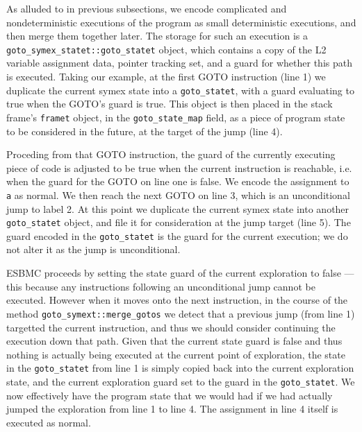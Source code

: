 \documentclass{article}
\begin{document}
As alluded to in previous subsections, we encode complicated and
nondeterministic executions of the program as small deterministic executions,
and then merge them together later. The storage for such an execution is a
\texttt{goto\_symex\_statet::goto\_statet} object, which contains a copy of
the L2 variable assignment data, pointer tracking set, and a guard for whether
this path is executed.  Taking our example, at the first GOTO instruction (line
1) we duplicate the current symex state into a \texttt{goto\_statet}, with a
guard evaluating to true when the GOTO's guard is true. This object is then
placed in the stack frame's \texttt{framet} object, in the
\texttt{goto\_state\_map} field, as a piece of program state to be considered
in the future, at the target of the jump (line 4).

Proceding from that GOTO instruction, the guard of the currently executing
piece of code is adjusted to be true when the current instruction is reachable,
i.e. when the guard for the GOTO on line one is false.
We encode the assignment to \texttt{a} as normal. We then reach the next
GOTO on line 3, which is an unconditional jump to label 2. At this point we
duplicate the current symex state into another \texttt{goto\_statet} object,
and file it for consideration at the jump target (line 5). The guard encoded
in the \texttt{goto\_statet} is the guard for the current execution; we do not
alter it as the jump is unconditional.

ESBMC proceeds by setting the state guard of the current exploration to
false --- this because any instructions following an unconditional jump cannot
be executed. However when it moves onto the next instruction, in the course
of the method \texttt{goto\_symext::merge\_gotos} we detect that a previous
jump (from line 1) targetted the current instruction, and thus we should
consider continuing the execution down that path. Given that the current state
guard is false and thus nothing is actually being executed at the current
point of exploration, the state in the \texttt{goto\_statet} from line 1 is
simply copied back into the current exploration state, and the current
exploration guard set to the guard in the \texttt{goto\_statet}. We now
effectively have the program state that we would had if we had actually
jumped the exploration from line 1 to line 4. The assignment in line 4 itself
is executed as normal.
\end{document}
